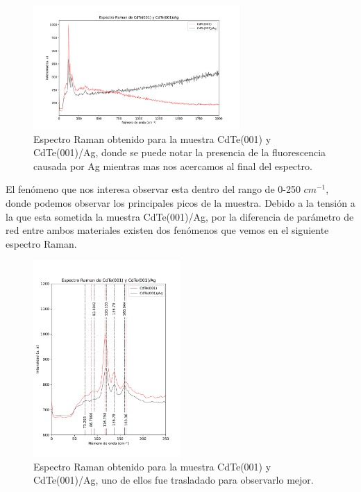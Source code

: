 \begin{figure}[h!]
    \centering
    \includegraphics[width=0.7\textwidth]{figures/chap4/raman-CdTeAg-all.pdf}
        \caption{Espectro Raman obtenido para la muestra CdTe(001) y CdTe(001)/Ag, donde se
        puede notar la presencia de la fluorescencia causada por Ag mientras mas nos 
        acercamos al final del espectro.}
    \label{fig:raman-cdte-all}
\end{figure}

El fenómeno que nos interesa observar esta dentro del rango de 0-250 $cm^{-1}$, donde podemos observar 
los principales picos de la muestra. Debido a la tensión a la que esta sometida la muestra 
CdTe(001)/Ag, por la diferencia de parámetro de red entre ambos materiales existen dos fenómenos 
que vemos en el siguiente espectro Raman.

\begin{figure}[h!]
    \centering
    \includegraphics[width=0.5\textwidth]{figures/chap4/raman-CdTeAg-250.pdf}
        \caption{Espectro Raman obtenido para la muestra CdTe(001) y CdTe(001)/Ag, uno de ellos 
        fue trasladado para observarlo mejor.}
    \label{fig:raman-cdte-all}
\end{figure}

